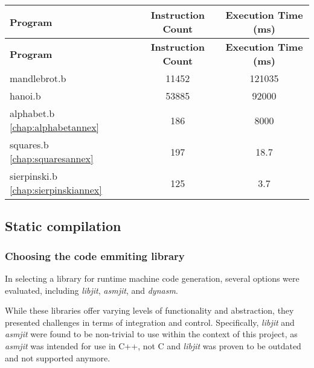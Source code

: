 \begin{longtable}{|l|c|c|}
\hline
\textbf{Program} & \textbf{Instruction Count} & \textbf{Execution Time (ms)} \\
\hline
\endfirsthead

\hline
\textbf{Program} & \textbf{Instruction Count} & \textbf{Execution Time (ms)} \\
\hline
\endhead

\hline
\endfoot

\endlastfoot

mandlebrot.b  & 11452  & 121035        \\
hanoi.b       & 53885  & 92000         \\
alphabet.b \ref{chap:alphabetannex}    & 186    & 8000          \\
squares.b \ref{chap:squaresannex}     & 197    & 18.7          \\
sierpinski.b \ref{chap:sierpinskiannex} & 125    & 3.7           \\

\hline
\end{longtable}

\vspace{-1em}
\label{tab:bench1}

\clearpage

\subsection{Static compilation}
\label{sec:ch2sec2sub2}

\subsubsection{Choosing the code emmiting library}
\label{sec:ch2sec2sub2sec1}

\par In selecting a library for runtime machine code generation, several options were evaluated, including \textit{libjit}, \textit{asmjit}, and \textit{dynasm}.

\par While these libraries offer varying levels of functionality and abstraction, they presented challenges in terms of integration and control. Specifically, \textit{libjit} and \textit{asmjit} were found to be non-trivial to use within the context of this project, as \textit{asmjit} was intended for use in C++, not C and \textit{libjit} was proven to be outdated and not supported anymore.

